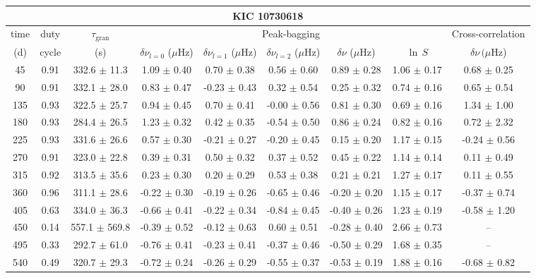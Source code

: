 \documentclass[twocolumn]{aastex61}%
\begin{document}
\begin{table*}[ht]\centering\fontsize{9.}{7.}\selectfont
\begin{tabular}{ccc|ccccc|c}
\multicolumn{9}{c}{KIC 10730618}\\ \hline\hline
time & duty & $\tau_\text{gran}$ &\multicolumn{5}{c|}{Peak-bagging}&Cross-correlation\\
(d)& cycle & (s)&$\delta\nu_{l=0}$ ($\mu$Hz) & $\delta\nu_{l=1}$ ($\mu$Hz) & $\delta\nu_{l=2}$ ($\mu$Hz) & $\delta\nu$ ($\mu$Hz)& $\ln\,S$ & $\delta\nu\,(\mu$Hz)\\\hline
45 & 0.91 & 332.6 $\pm$ 11.3 & 1.09 $\pm$ 0.40 & 0.70 $\pm$ 0.38 & 0.56 $\pm$ 0.60 & 0.89 $\pm$ 0.28 & 1.06 $\pm$ 0.17 & 0.68 $\pm$ 0.25\\
90 & 0.91 & 332.1 $\pm$ 28.0 & 0.83 $\pm$ 0.47 & -0.23 $\pm$ 0.43 & 0.32 $\pm$ 0.54 & 0.25 $\pm$ 0.32 & 0.74 $\pm$ 0.16 & 0.65 $\pm$ 0.54\\
135 & 0.93 & 322.5 $\pm$ 25.7 & 0.94 $\pm$ 0.45 & 0.70 $\pm$ 0.41 & -0.00 $\pm$ 0.56 & 0.81 $\pm$ 0.30 & 0.69 $\pm$ 0.16 & 1.34 $\pm$ 1.00\\
180 & 0.93 & 284.4 $\pm$ 26.5 & 1.23 $\pm$ 0.32 & 0.42 $\pm$ 0.35 & -0.54 $\pm$ 0.50 & 0.86 $\pm$ 0.24 & 0.82 $\pm$ 0.16 & 0.72 $\pm$ 2.32\\
225 & 0.93 & 331.6 $\pm$ 26.6 & 0.57 $\pm$ 0.30 & -0.21 $\pm$ 0.27 & -0.20 $\pm$ 0.45 & 0.15 $\pm$ 0.20 & 1.17 $\pm$ 0.15 & -0.24 $\pm$ 0.56\\
270 & 0.91 & 323.0 $\pm$ 22.8 & 0.39 $\pm$ 0.31 & 0.50 $\pm$ 0.32 & 0.37 $\pm$ 0.52 & 0.45 $\pm$ 0.22 & 1.14 $\pm$ 0.14 & 0.11 $\pm$ 0.49\\
315 & 0.92 & 313.5 $\pm$ 35.6 & 0.23 $\pm$ 0.30 & 0.20 $\pm$ 0.29 & 0.53 $\pm$ 0.38 & 0.21 $\pm$ 0.21 & 1.27 $\pm$ 0.17 & 0.11 $\pm$ 0.55\\
360 & 0.96 & 311.1 $\pm$ 28.6 & -0.22 $\pm$ 0.30 & -0.19 $\pm$ 0.26 & -0.65 $\pm$ 0.46 & -0.20 $\pm$ 0.20 & 1.15 $\pm$ 0.17 & -0.37 $\pm$ 0.74\\
405 & 0.63 & 334.0 $\pm$ 36.3 & -0.66 $\pm$ 0.41 & -0.22 $\pm$ 0.34 & -0.84 $\pm$ 0.45 & -0.40 $\pm$ 0.26 & 1.23 $\pm$ 0.19 & -0.58 $\pm$ 1.20\\
450 & 0.14 & 557.1 $\pm$ 569.8 & -0.39 $\pm$ 0.52 & -0.12 $\pm$ 0.63 & 0.60 $\pm$ 0.51 & -0.28 $\pm$ 0.40 & 2.66 $\pm$ 0.73 & --\\
495 & 0.33 & 292.7 $\pm$ 61.0 & -0.76 $\pm$ 0.41 & -0.23 $\pm$ 0.41 & -0.37 $\pm$ 0.46 & -0.50 $\pm$ 0.29 & 1.68 $\pm$ 0.35 & --\\
540 & 0.49 & 320.7 $\pm$ 29.3 & -0.72 $\pm$ 0.24 & -0.26 $\pm$ 0.29 & -0.55 $\pm$ 0.37 & -0.53 $\pm$ 0.19 & 1.88 $\pm$ 0.16 & -0.68 $\pm$ 0.82\\

\end{tabular}
\end{table*}
\end{document}
